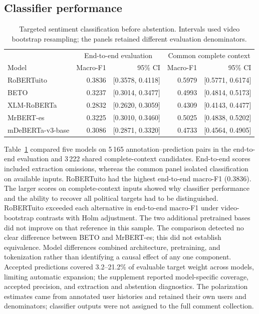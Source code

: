 \documentclass[conference, letterpaper]{IEEEtran}
\begin{document}
\subsection{Classifier performance}
\begin{table}[t]\centering\small
\caption{Targeted sentiment classification before abstention. Intervals used video bootstrap resampling; the panels retained different evaluation denominators.}
\label{tab:clasificadores}
\begin{tabular}{lrrrr}\toprule
& \multicolumn{2}{c}{End-to-end evaluation} & \multicolumn{2}{c}{Common complete context}\\
Model & Macro-F1 & 95\% CI & Macro-F1 & 95\% CI\\\midrule
RoBERTuito & 0.3836 & [0.3578, 0.4118] & 0.5979 & [0.5771, 0.6174]\\
BETO & 0.3237 & [0.3014, 0.3477] & 0.4993 & [0.4814, 0.5173]\\
XLM-RoBERTa & 0.2832 & [0.2620, 0.3059] & 0.4309 & [0.4143, 0.4477]\\
MrBERT-es & 0.3225 & [0.3010, 0.3460] & 0.5025 & [0.4838, 0.5202]\\
mDeBERTa-v3-base & 0.3086 & [0.2871, 0.3320] & 0.4733 & [0.4564, 0.4905]\\
\bottomrule\end{tabular}\end{table}

Table~\ref{tab:clasificadores} compared five models on 5\,165 annotation--prediction pairs in the end-to-end evaluation and 3\,222 shared complete-context candidates. End-to-end scores included extraction omissions, whereas the common panel isolated classification on available inputs. RoBERTuito had the highest end-to-end macro-F1 (0.3836). The larger scores on complete-context inputs showed why classifier performance and the ability to recover all political targets had to be distinguished.
RoBERTuito exceeded each alternative in end-to-end macro-F1 under video-bootstrap contrasts with Holm adjustment. The two additional pretrained bases did not improve on that reference in this sample.
The comparison detected no clear difference between BETO and MrBERT-es; this did not establish equivalence. Model differences combined architecture, pretraining, and tokenization rather than identifying a causal effect of any one component.
Accepted predictions covered 3.2--21.2\% of evaluable target weight across models, limiting automatic expansion; the supplement reported model-specific coverage, accepted precision, and extraction and abstention diagnostics. The polarization estimates came from annotated user histories and retained their own users and denominators; classifier outputs were not assigned to the full comment collection.
\end{document}
